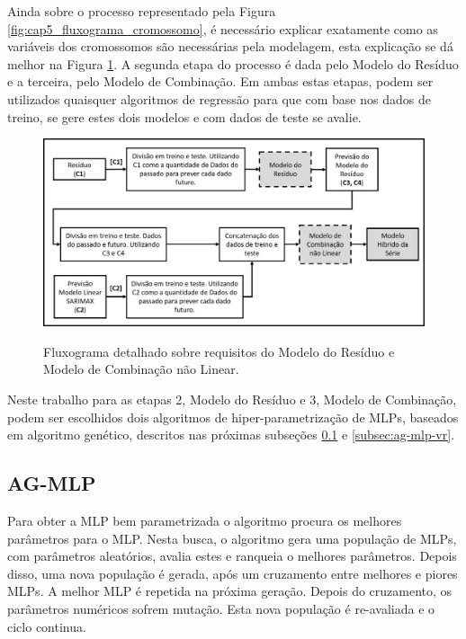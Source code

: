 Ainda sobre o processo representado pela Figura \ref{fig:cap5_fluxograma_cromossomo}, é necessário explicar exatamente como as variáveis dos cromossomos são necessárias pela modelagem, esta explicação se dá melhor na Figura \ref{fig:cap5_fluxograma_modelos_res_comb}. A segunda etapa do processo é dada pelo Modelo do Resíduo e a terceira, pelo Modelo de Combinação. Em ambas estas etapas, podem ser utilizados quaisquer algoritmos de regressão para que com base nos dados de treino, se gere estes dois modelos e com dados de teste se avalie. 

\begin{figure}[htbp]
    \centering
    \caption{Fluxograma detalhado sobre requisitos do Modelo do Resíduo e Modelo de Combinação não Linear.}
    \includegraphics[width=\textwidth]{Figuras/cap5/fluxograma_modelos_res_comb.jpg}
    \label{fig:cap5_fluxograma_modelos_res_comb}
\end{figure}

Neste trabalho para as etapas 2, Modelo do Resíduo e 3, Modelo de Combinação, podem ser escolhidos dois algoritmos de hiper-parametrização de MLPs, baseados em algoritmo genético, descritos nas próximas subseções \ref{subsec:ag-mlp} e \ref{subsec:ag-mlp-vr}.

\subsection{AG-MLP}
\label{subsec:ag-mlp}

Para obter a MLP bem parametrizada o algoritmo procura os melhores parâmetros para o MLP. Nesta busca, o algoritmo gera uma população de MLPs, com parâmetros aleatórios, avalia estes e ranqueia o melhores parâmetros. Depois disso, uma nova população é gerada, após um cruzamento entre melhores e piores MLPs. A melhor MLP é repetida na próxima geração. Depois do cruzamento, os parâmetros numéricos sofrem mutação. Esta nova população é re-avaliada e o ciclo continua.

